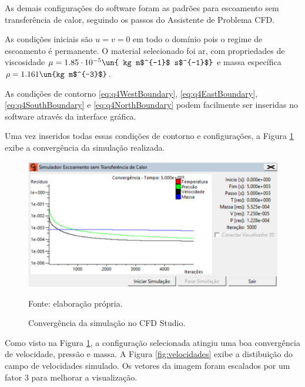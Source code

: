 As demais configurações do software foram as padrões para escoamento sem transferência de calor,
seguindo os passos do Assistente de Problema CFD.

As condições iniciais são $u = v = 0$ em todo o domínio pois o regime de escoamento é permanente.
O material selecionado foi ar, com propriedades de viscosidade $\mu=1.85 \cdot 10^{-5} \un{ kg m$^{-1}$ s$^{-1}$}$ e
massa específica $\rho=1.161 \un{kg m$^{-3}$}$.

As condições de contorno \eqref{eq:q4WestBoundary}, \eqref{eq:q4EastBoundary}, 
\eqref{eq:q4SouthBoundary} e \eqref{eq:q4NorthBoundary} podem facilmente ser inseridas 
no software através da interface gráfica. 

Uma vez inseridos todas essas condições de contorno e configurações, a Figura \ref*{fig:convergencia}
exibe a convergência da simulação realizada.

\begin{figure}[h!]
    \caption{Convergência da simulação no CFD Studio.}
    \label{fig:convergencia}
    \centering
    \centerline{\includegraphics[scale=0.45]{convergencia.png}}
    \par{Fonte: elaboração própria.}
\end{figure}

Como visto na Figura \ref*{fig:convergencia}, a configuração selecionada atingiu uma boa  
convergência de velocidade, pressão e massa. A Figura \ref*{fig:velocidades} exibe a 
distibuição do campo de velocidades simulado. Os vetores da imagem foram escalados por um fator
3 para melhorar a visualização.

